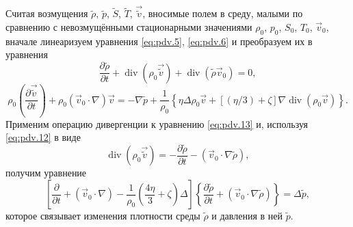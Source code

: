 Считая возмущения $\tilde{\rho}$, $\tilde{p}$, $\tilde{S}$, $\tilde{T}$, $\vec{\tilde{v}}$, вносимые полем в среду, малыми по сравнению с невозмущёнными стационарными значениями $\rho_0$, $p_0$, $S_0$, $T_0$, $\vec{v}_0$, вначале линеаризуем уравнения \eqref{eq:pdv.5}, \eqref{eq:pdv.6} и преобразуем их в уравнения
\begin{equation}
	\label{eq:pdv.12}
	\frac{\partial \tilde{\rho}}{\partial t}+\operatorname{div}\left(\rho_{0} \vec{\tilde{v}}\right)+\operatorname{div}\left(\tilde{\rho} \vec{v}_{0}\right)=0,
\end{equation}
\begin{equation}
	\label{eq:pdv.13}
	\rho_{0}\left(\frac{\partial \vec{\tilde{v}}}{\partial t}\right)+\rho_{0}\left(\vec{v}_{0} \cdot \nabla\right) \vec{v}=-\nabla \tilde{p}+\frac{1}{\rho_{0}}\left\{\eta \Delta \rho_{0} \vec{v}+[(\eta / 3)+\zeta] \nabla \operatorname{div}\left(\rho_{0} \vec{v}\right)\right\}.	
\end{equation}
Применим операцию дивергенции к уравнению \eqref{eq:pdv.13} и, используя \eqref{eq:pdv.12} в виде
\begin{equation}
	\label{eq:pdv.12'}
	\operatorname{div}\left(\rho_{0} \vec{\tilde{v}}\right)=-\frac{\partial \tilde{\rho}}{\partial t}-\left(\vec{v}_{0} \cdot \nabla \tilde{\rho}\right),
\end{equation}
получим уравнение
\begin{equation}
	\label{eq:pdv.14}
	\left[\frac{\partial}{\partial t}+\left(\vec{v}_{0} \cdot \nabla\right)-\frac{1}{\rho_{0}}\left(\frac{4 \eta}{3}+\zeta\right) \Delta\right]\left\{\frac{\partial \tilde{\rho}}{\partial t}+\left(\vec{v}_{0} \cdot \nabla \tilde{\rho}\right)\right\}=\Delta \tilde{p},
\end{equation}
которое связывает изменения плотности среды $\tilde{\rho}$ и давления в ней $\tilde{p}$.

